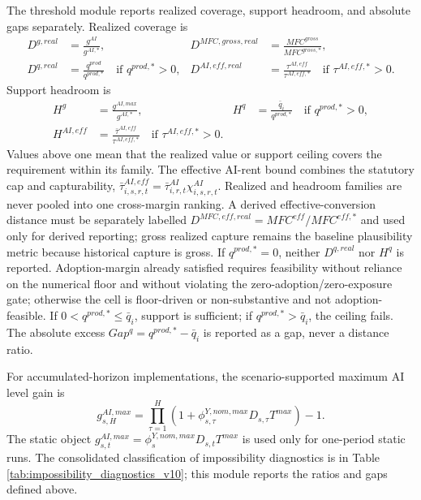\documentclass[11pt,a4paper]{article}
\begin{document}
The threshold module reports realized coverage, support headroom, and absolute gaps separately. Realized coverage is
\begin{align}\label{eq:distance_ratios_main_v19}
    D^{g,real}&=\frac{g^{AI}}{g^{AI,*}},
    &D^{MFC,gross,real}&=\frac{MFC^{gross}}{MFC^{gross,*}},\\
    D^{q,real}&=\frac{q^{prod}}{q^{prod,*}}\quad\text{if }q^{prod,*}>0,
    &D^{AI,eff,real}&=\frac{\tau^{AI,eff}}{\tau^{AI,eff,*}}\quad\text{if }\tau^{AI,eff,*}>0.
\end{align}
Support headroom is
\begin{align}\label{eq:headroom_ratios_main_v19}
    H^g&=\frac{g^{AI,max}}{g^{AI,*}},
    &H^q&=\frac{\bar q_i}{q^{prod,*}}\quad\text{if }q^{prod,*}>0,\\
    H^{AI,eff}&=\frac{\bar\tau^{AI,eff}}{\tau^{AI,eff,*}}\quad\text{if }\tau^{AI,eff,*}>0.
\end{align}
Values above one mean that the realized value or support ceiling covers the requirement within its family. The effective AI-rent bound combines the statutory cap and capturability, $\bar\tau^{AI,eff}_{i,s,r,t}=\bar\tau^{AI}_{i,r,t}\chi^{AI}_{i,s,r,t}$. Realized and headroom families are never pooled into one cross-margin ranking. A derived effective-conversion distance must be separately labelled $D^{MFC,eff,real}=MFC^{eff}/MFC^{eff,*}$ and used only for derived reporting; gross realized capture remains the baseline plausibility metric because historical capture is gross.
If $q^{prod,*}=0$, neither $D^{q,real}$ nor $H^q$ is reported. Adoption-margin already satisfied requires feasibility without reliance on the numerical floor and without violating the zero-adoption/zero-exposure gate; otherwise the cell is floor-driven or non-substantive and not adoption-feasible. If $0<q^{prod,*}\leq\bar q_i$, support is sufficient; if $q^{prod,*}>\bar q_i$, the ceiling fails. The absolute excess $Gap^q=q^{prod,*}-\bar q_i$ is reported as a gap, never a distance ratio.


For accumulated-horizon implementations, the scenario-supported maximum AI level gain is
\begin{equation}
    g^{AI,max}_{s,H}=\prod_{\tau=1}^{H}\left(1+\phi^{Y,nom,max}_{s,\tau}D_{s,\tau}T^{max}\right)-1.
\end{equation}
The static object $g^{AI,max}_{s,t}=\phi^{Y,nom,max}_sD_{s,t}T^{max}$ is used only for one-period static runs. The consolidated classification of impossibility diagnostics is in Table \ref{tab:impossibility_diagnostics_v10}; this module reports the ratios and gaps defined above.
\end{document}
